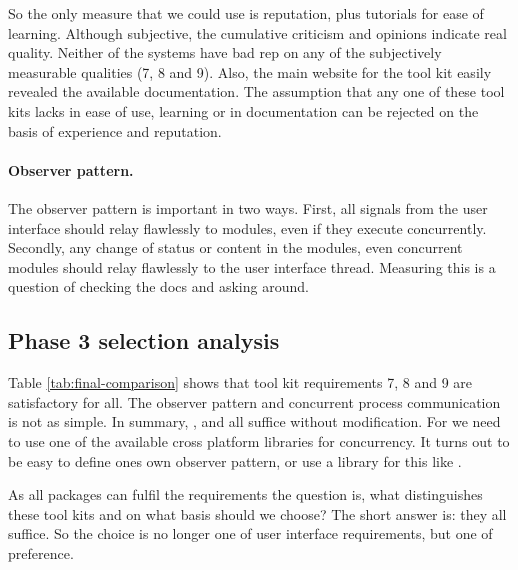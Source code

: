 So the only measure that we could use is reputation, plus tutorials for ease
of learning.  Although subjective, the cumulative criticism and opinions
indicate real quality. Neither of the systems have bad rep on any of the
subjectively measurable qualities (7, 8 and 9). Also, the main website for the
tool kit easily revealed the available documentation. The assumption that any
one of these tool kits lacks in ease of use, learning or in documentation can
be rejected on the basis of experience and reputation. 

\paragraph{Observer pattern.} The observer pattern is important in two ways.
First, all signals from the user interface should relay flawlessly to modules,
even if they execute concurrently. Secondly, any change of status or content in
the modules, even concurrent modules should relay flawlessly to the user
interface thread. Measuring this is a question of checking the docs and asking
around. 

\subsection{Phase 3 selection analysis}

Table \ref{tab:final-comparison} shows that tool kit requirements 7, 8 and 9
are satisfactory for all. The observer pattern and concurrent process
communication is not as simple. In summary, ,  and 
all suffice without modification. For  we need to use one of the
available cross platform libraries for concurrency. It turns out to be easy
to define ones own observer pattern, or use a library for this like .

As all packages can fulfil the requirements the question is, what distinguishes
these tool kits and on what basis should we choose? The short answer is: they
all suffice. So the choice is no longer one of user interface requirements, but
one of preference. 

